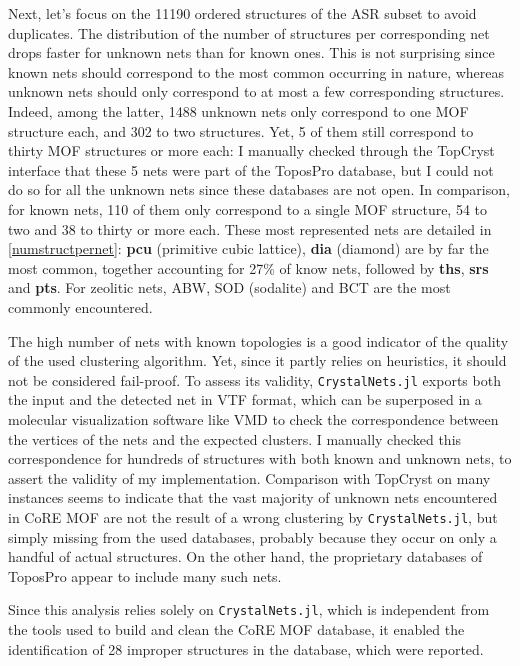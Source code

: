 \documentclass[main.tex]{subfiles}
\begin{document}
Next, let's focus on the \num{11190} ordered structures of the ASR subset to avoid duplicates.
The distribution of the number of structures per corresponding net drops faster for unknown nets than for known ones. This is not surprising since known nets should correspond to the most common occurring in nature, whereas unknown nets should only correspond to at most a few corresponding structures. Indeed, among the latter, \num{1488} unknown nets only correspond to one MOF structure each, and 302 to two structures. Yet, 5 of them still correspond to thirty MOF structures or more each: I manually checked through the TopCryst interface \autocite{TopCryst} that these 5 nets were part of the ToposPro database, but I could not do so for all the unknown nets since these databases are not open. In comparison, for known nets, 110 of them only correspond to a single MOF structure, 54 to two and 38 to thirty or more each. These most represented nets are detailed in \cref{numstructpernet}: \textbf{pcu} (primitive cubic lattice), \textbf{dia} (diamond) are by far the most common, together accounting for {27\%} of know nets, followed by \textbf{ths}, \textbf{srs} and \textbf{pts}. For zeolitic nets, ABW, SOD (sodalite) and BCT are the most commonly encountered.

The high number of nets with known topologies is a good indicator of the quality of the used clustering algorithm. Yet, since it partly relies on heuristics, it should not be considered fail-proof. To assess its validity, \texttt{CrystalNets.jl} exports both the input and the detected net in VTF format, which can be superposed in a molecular visualization software like VMD \autocite{VMD} to check the correspondence between the vertices of the nets and the expected clusters. I manually checked this correspondence for hundreds of structures with both known and unknown nets, to assert the validity of my implementation. Comparison with TopCryst on many instances seems to indicate that the vast majority of unknown nets encountered in CoRE MOF are not the result of a wrong clustering by \texttt{CrystalNets.jl}, but simply missing from the used databases, probably because they occur on only a handful of actual structures. On the other hand, the proprietary databases of ToposPro appear to include many such nets.

Since this analysis relies solely on \texttt{CrystalNets.jl}, which is independent from the tools used to build and clean the CoRE MOF database, it enabled the identification of 28 improper structures in the database, which were reported.
\end{document}
